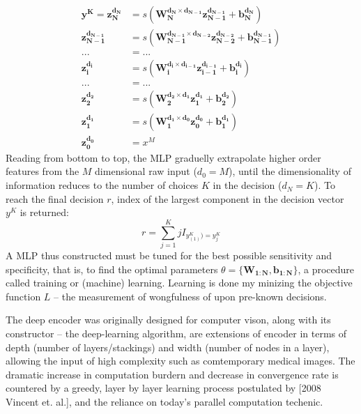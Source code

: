 \documentclass[twocolumn]{article}
\begin{document}
\begin{equation*} \label{eq_MLP}
\begin{split}
  \boldsymbol{y^K}=
  \boldsymbol{z_N^{d_N}}         &= s(\boldsymbol{W_N^{d_N \times d_{N-1}}z_{N-1}^{d_{N-1}}}+\boldsymbol{b_N^{d_N}}) \\
  \boldsymbol{z_{N-1}^{d_{N-1}}} &= s(\boldsymbol{W_{N-1}^{d_{N-1} \times d_{N-2}}z_{N-2}^{d_{N-2}}}+\boldsymbol{b_{N-1}^{d_{N-1}}}) \\
  ... &= ... \\
  \boldsymbol{z_i^{d_i}}         &= s(\boldsymbol{W_i^{d_i \times d_{i-1}}z_{i-1}^{d_{i-1}}}+\boldsymbol{b_i^{d_i}}) \\
  ... &= ... \\
  \boldsymbol{z_2^{d_2}}         &= s(\boldsymbol{W_2^{d_2 \times d_1}z_1^{d_1}}+\boldsymbol{b_2^{d_2}}) \\
  \boldsymbol{z_1^{d_1}}         &= s(\boldsymbol{W_1^{d_1 \times d_0}z_0^{d_0}}+\boldsymbol{b_1^{d_1}}) \\
  \boldsymbol{z_0^{d_0}}         &= x^M
\end{split}
\end{equation*}
Reading from bottom to top, the MLP graduelly extrapolate higher order features from the $M$ dimensional raw input ($d_0=M$), until the dimensionality of information reduces to the number of choices $K$ in the decision ($d_N=K$). To reach the final decision $r$, index of the largest component in the decision vector $y^K$ is returned:
\[r=\sum_{j=1}^K{jI_{y_{(1)}^K)=y_j^K}}\]
A MLP thus constructed must be tuned for the best possible sensitivity and specificity, that is, to find the optimal parameters $\theta=\{\boldsymbol{W_{1:N}},\boldsymbol{b_{1:N}}\}$, a procedure called training or (machine) learning. Learning is done my minizing the objective function $L$ -- the measurement of wongfulness of upon pre-known decisions.

The deep encoder was originally designed for computer vison, along with its constructor -- the deep-learning algorithm, are extensions of encoder in terms of depth (number of layers/stackings) and width (number of nodes in a layer), allowing the input of high complexity such as comtemporary medical images. The dramatic increase in computation burdern and decrease in convergence rate is countered by a greedy, layer by layer learning process postulated by [2008 Vincent et. al.], and the reliance on today's parallel computation techenic.
\end{document}
